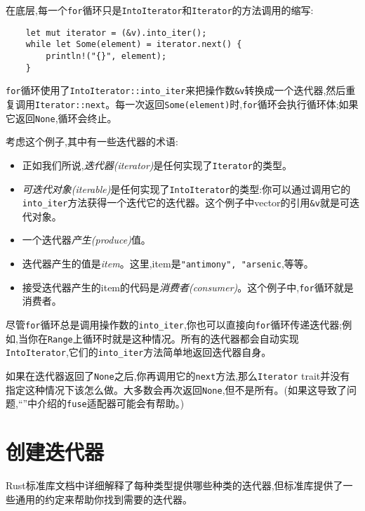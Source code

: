 在底层,每一个\texttt{for}循环只是\texttt{IntoIterator}和\texttt{Iterator}的方法调用的缩写:
\begin{verbatim}
    let mut iterator = (&v).into_iter();
    while let Some(element) = iterator.next() {
        println!("{}", element);
    }
\end{verbatim}

\texttt{for}循环使用了\texttt{IntoIterator::into\_iter}来把操作数\texttt{\&v}转换成一个迭代器,然后重复调用\texttt{Iterator::next}。每一次返回\texttt{Some(element)}时,\texttt{for}循环会执行循环体;如果它返回\texttt{None},循环会终止。

考虑这个例子,其中有一些迭代器的术语:
\begin{itemize}
    \item 正如我们所说,\emph{迭代器(iterator)}是任何实现了\texttt{Iterator}的类型。
    \item \emph{可迭代对象(iterable)}是任何实现了\texttt{IntoIterator}的类型:你可以通过调用它的\texttt{into\_iter}方法获得一个迭代它的迭代器。这个例子中vector的引用\texttt{\&v}就是可迭代对象。
    \item 一个迭代器\emph{产生(produce)}值。
    \item 迭代器产生的值是\emph{item}。这里,item是\texttt{"antimony", "arsenic},等等。
    \item 接受迭代器产生的item的代码是\emph{消费者(consumer)}。这个例子中,\texttt{for}循环就是消费者。
\end{itemize}

尽管\texttt{for}循环总是调用操作数的\texttt{into\_iter},你也可以直接向\texttt{for}循环传递迭代器;例如,当你在\texttt{Range}上循环时就是这种情况。所有的迭代器都会自动实现\texttt{IntoIterator},它们的\texttt{into\_iter}方法简单地返回迭代器自身。

如果在迭代器返回了\texttt{None}之后,你再调用它的\texttt{next}方法,那么\texttt{Iterator} trait并没有指定这种情况下该怎么做。大多数会再次返回\texttt{None},但不是所有。(如果这导致了问题,“”中介绍的\texttt{fuse}适配器可能会有帮助。)

\section{创建迭代器}
Rust标准库文档中详细解释了每种类型提供哪些种类的迭代器,但标准库提供了一些通用的约定来帮助你找到需要的迭代器。

